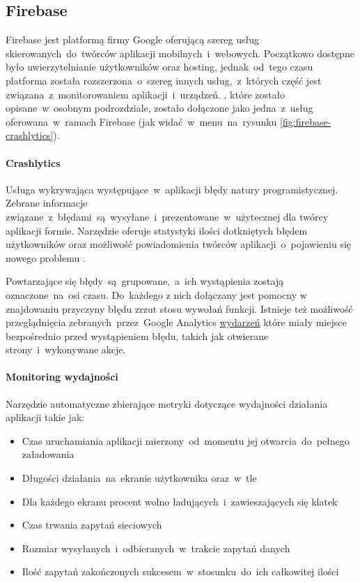 \subsection{Firebase}
\label{sec:firebase}
Firebase jest platformą firmy Google oferującą szereg usług skierowanych~do~twórców aplikacji mobilnych~i~webowych. Początkowo dostępne było uwierzytelnianie użytkowników oraz hosting, jednak~od~tego czasu platforma została rozszerzona~o~szereg innych usług,~z~których część jest związana~z~monitorowaniem aplikacji~i~urządzeń. , które zostało opisane~w~osobnym podrozdziale, zostało dołączone jako jedna~z~usług oferowana~w~ramach Firebase (jak widać~w~menu~na~rysunku \ref{fig:firebase-crashlytics}).

\bigskip
{}

\paragraph{Crashlytics}
Usługa wykrywająca występujące~w~aplikacji błędy natury programistycznej. Zebrane informacje związane~z~błędami~są~wysyłane~i~prezentowane~w~użytecznej dla twórcy aplikacji formie. Narzędzie oferuje statystyki ilości dotkniętych błędem użytkowników oraz możliwość powiadomienia twórców aplikacji~o~pojawieniu się nowego problemu \cite{Fb_Crashlytics}.

Powtarzające się błędy~są~grupowane,~a~ich wystąpienia zostają oznaczone~na~osi czasu. Do~każdego z nich dołączany jest pomocny w znajdowaniu przyczyny błędu zrzut stosu wywołań funkcji. Istnieje też możliwość przeglądnięcia zebranych~przez~Google Analytics \hyperref[par:ga-events]{wydarzeń} które miały miejsce bezpośrednio przed wystąpieniem błędu, takich jak otwierane strony~i~wykonywane akcje. 

\paragraph{Monitoring wydajności}
Narzędzie automatyczne zbierające metryki dotyczące wydajności działania aplikacji takie jak:
\begin{itemize}
	\item Czas uruchamiania aplikacji mierzony~od~momentu jej otwarcia~do~pełnego załadowania
	\item Długości działania~na~ekranie użytkownika oraz~w~tle
	\item Dla każdego ekranu procent wolno ładujących~i~zawieszających się klatek
	\item Czas trwania zapytań sieciowych
	\item Rozmiar wysyłanych~i~odbieranych~w~trakcie zapytań danych
	\item Ilość zapytań zakończonych sukcesem~w~stosunku~do~ich całkowitej ilości
\end{itemize}
\bigskip

